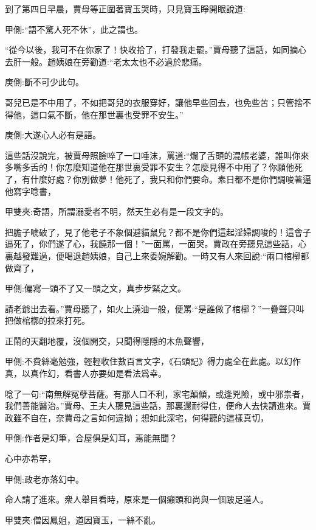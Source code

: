 \begin{parag}
    到了第四日早晨，賈母等正圍著寶玉哭時，只見寶玉睜開眼說道:\begin{note}甲側:“語不驚人死不休”，此之謂也。\end{note}“從今以後，我可不在你家了！快收拾了，打發我走罷。”賈母聽了這話，如同摘心去肝一般。趙姨娘在旁勸道:“老太太也不必過於悲痛。\begin{note}庚側:斷不可少此句。\end{note}哥兒已是不中用了，不如把哥兒的衣服穿好，讓他早些回去，也免些苦；只管捨不得他，這口氣不斷，他在那世裏也受罪不安生。”\begin{note}庚側:大遂心人必有是語。\end{note}這些話沒說完，被賈母照臉啐了一口唾沫，罵道:“爛了舌頭的混帳老婆，誰叫你來多嘴多舌的！你怎麼知道他在那世裏受罪不安生？怎麼見得不中用了？你願他死了，有什麼好處？你別做夢！他死了，我只和你們要命。素日都不是你們調唆著逼他寫字唸書，\begin{note}甲雙夾:奇語，所謂溺愛者不明，然天生必有是一段文字的。\end{note}把膽子唬破了，見了他老子不象個避貓鼠兒？都不是你們這起淫婦調唆的！這會子逼死了，你們遂了心，我饒那一個！”一面罵，一面哭。賈政在旁聽見這些話，心裏越發難過，便喝退趙姨娘，自己上來委婉解勸。一時又有人來回說:“兩口棺槨都做齊了，\begin{note}甲側:偏寫一頭不了又一頭之文，真步步緊之文。\end{note}請老爺出去看。”賈母聽了，如火上澆油一般，便罵:“是誰做了棺槨？”一疊聲只叫把做棺槨的拉來打死。
\end{parag}


\begin{parag}
    正鬧的天翻地覆，沒個開交，只聞得隱隱的木魚聲響，\begin{note}甲側:不費絲毫勉強，輕輕收住數百言文字，《石頭記》得力處全在此處。以幻作真，以真作幻，看書人亦要如是看法爲幸。\end{note}唸了一句:“南無解冤孽菩薩。有那人口不利，家宅顛傾，或逢兇險，或中邪祟者，我們善能醫治。”賈母、王夫人聽見這些話，那裏還耐得住，便命人去快請進來。賈政雖不自在，奈賈母之言如何違拗；想如此深宅，何得聽的這樣真切，\begin{note}甲側:作者是幻筆，合屋俱是幻耳，焉能無聞？\end{note}心中亦希罕，\begin{note}甲側:政老亦落幻中。\end{note}命人請了進來。衆人舉目看時，原來是一個癩頭和尚與一個跛足道人。\begin{note}甲雙夾:僧因鳳姐，道因寶玉，一絲不亂。\end{note}
\end{parag}


